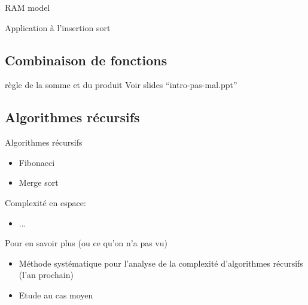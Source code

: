 



\begin{frame}{RAM model}

\end{frame}

\begin{frame}{Application à l'insertion sort}
\end{frame}

\subsection{Combinaison de fonctions}

\begin{frame}{règle de la somme et du produit}
Voir slides ``intro-pas-mal.ppt''
\end{frame}

\subsection{Algorithmes récursifs}

\begin{frame}{Algorithmes récursifs}

\begin{itemize}
\item Fibonacci
\item Merge sort
\end{itemize}

\end{frame}

\begin{frame}
Complexité en espace:
\begin{itemize}
\item ...
\end{itemize}
\end{frame}

\begin{frame}{Pour en savoir plus (ou ce qu'on n'a pas vu)}

\begin{itemize}
\item Méthode systématique pour l'analyse de la complexité d'algorithmes récursifs (l'an prochain)
\item Etude au cas moyen
\end{itemize}

\end{frame}


